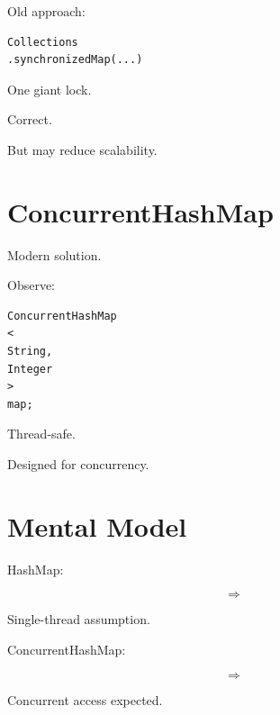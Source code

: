 \documentclass[11pt,a4paper]{book}
\begin{document}
Old approach:

\begin{verbatim} 
Collections
.synchronizedMap(...)
\end{verbatim}


One giant lock.


Correct.


But may reduce scalability.


\section{ConcurrentHashMap}

Modern solution.


Observe:

\begin{verbatim} 
ConcurrentHashMap
<
String,
Integer
>
map;
\end{verbatim}


Thread-safe.


Designed for concurrency.


\section{Mental Model}

HashMap:

\[
\Rightarrow
\]

Single-thread assumption.


ConcurrentHashMap:

\[
\Rightarrow
\]

Concurrent access expected.

\end{document}
